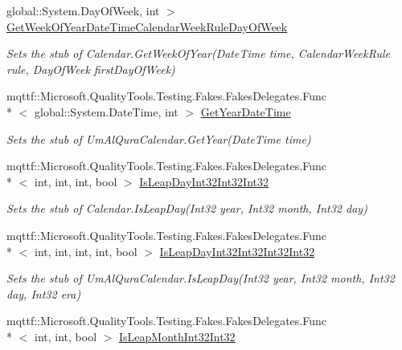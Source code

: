 \begin{DoxyCompactItemize}
global\-::\-System.\-Day\-Of\-Week, int $>$ \hyperlink{class_system_1_1_globalization_1_1_fakes_1_1_stub_um_al_qura_calendar_abe310e6c3a134af5b2001d46dc822d92}{Get\-Week\-Of\-Year\-Date\-Time\-Calendar\-Week\-Rule\-Day\-Of\-Week}
\begin{DoxyCompactList}\small\item\em Sets the stub of Calendar.\-Get\-Week\-Of\-Year(\-Date\-Time time, Calendar\-Week\-Rule rule, Day\-Of\-Week first\-Day\-Of\-Week)\end{DoxyCompactList}\item 
mqttf\-::\-Microsoft.\-Quality\-Tools.\-Testing.\-Fakes.\-Fakes\-Delegates.\-Func\\*
$<$ global\-::\-System.\-Date\-Time, int $>$ \hyperlink{class_system_1_1_globalization_1_1_fakes_1_1_stub_um_al_qura_calendar_ae50375138247392f920faa27718dcf2f}{Get\-Year\-Date\-Time}
\begin{DoxyCompactList}\small\item\em Sets the stub of Um\-Al\-Qura\-Calendar.\-Get\-Year(\-Date\-Time time)\end{DoxyCompactList}\item 
mqttf\-::\-Microsoft.\-Quality\-Tools.\-Testing.\-Fakes.\-Fakes\-Delegates.\-Func\\*
$<$ int, int, int, bool $>$ \hyperlink{class_system_1_1_globalization_1_1_fakes_1_1_stub_um_al_qura_calendar_af5b3de7affdaec6447af89aea8beb108}{Is\-Leap\-Day\-Int32\-Int32\-Int32}
\begin{DoxyCompactList}\small\item\em Sets the stub of Calendar.\-Is\-Leap\-Day(\-Int32 year, Int32 month, Int32 day)\end{DoxyCompactList}\item 
mqttf\-::\-Microsoft.\-Quality\-Tools.\-Testing.\-Fakes.\-Fakes\-Delegates.\-Func\\*
$<$ int, int, int, int, bool $>$ \hyperlink{class_system_1_1_globalization_1_1_fakes_1_1_stub_um_al_qura_calendar_afceb2cc2031902f42f8fc2ebf1c36b23}{Is\-Leap\-Day\-Int32\-Int32\-Int32\-Int32}
\begin{DoxyCompactList}\small\item\em Sets the stub of Um\-Al\-Qura\-Calendar.\-Is\-Leap\-Day(\-Int32 year, Int32 month, Int32 day, Int32 era)\end{DoxyCompactList}\item 
mqttf\-::\-Microsoft.\-Quality\-Tools.\-Testing.\-Fakes.\-Fakes\-Delegates.\-Func\\*
$<$ int, int, bool $>$ \hyperlink{class_system_1_1_globalization_1_1_fakes_1_1_stub_um_al_qura_calendar_a66e168946379bc653cbf7a9a54779f4c}{Is\-Leap\-Month\-Int32\-Int32}

\end{DoxyCompactItemize}

